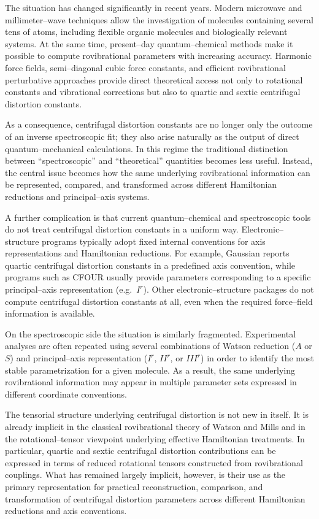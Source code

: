 The situation has changed significantly in recent years. Modern
microwave and millimeter--wave techniques allow the investigation of
molecules containing several tens of atoms, including flexible
organic molecules and biologically relevant systems. At the same time,
present--day quantum--chemical methods make it possible to compute
rovibrational parameters with increasing accuracy. Harmonic force
fields, semi--diagonal cubic force constants, and efficient
rovibrational perturbative approaches provide direct theoretical
access not only to rotational constants and vibrational corrections
but also to quartic and sextic centrifugal distortion
constants.\cite{Mills1972,Nielsen1951}

As a consequence, centrifugal distortion constants are no longer only
the outcome of an inverse spectroscopic fit; they also arise naturally
as the output of direct quantum--mechanical calculations. In this
regime the traditional distinction between ``spectroscopic'' and
``theoretical'' quantities becomes less useful. Instead, the central
issue becomes how the same underlying rovibrational information can be
represented, compared, and transformed across different Hamiltonian
reductions and principal--axis systems.

A further complication is that current quantum--chemical and
spectroscopic tools do not treat centrifugal distortion constants in
a uniform way. Electronic--structure programs typically adopt fixed
internal conventions for axis representations and Hamiltonian
reductions. For example, Gaussian reports quartic centrifugal
distortion constants in a predefined axis convention, while programs
such as CFOUR usually provide parameters corresponding to a specific
principal--axis representation (e.g.\ $I^r$). Other electronic--structure
packages do not compute centrifugal distortion constants at all, even
when the required force--field information is available.

On the spectroscopic side the situation is similarly fragmented.
Experimental analyses are often repeated using several combinations of
Watson reduction ($A$ or $S$) and principal--axis representation
($I^r$, $II^r$, or $III^r$) in order to identify the most stable
parametrization for a given molecule. As a result, the same underlying
rovibrational information may appear in multiple parameter sets
expressed in different coordinate conventions.

The tensorial structure underlying centrifugal distortion is not new
in itself. It is already implicit in the classical rovibrational
theory of Watson and Mills and in the rotational--tensor viewpoint
underlying effective Hamiltonian treatments.
\cite{Mills1972,Watson1968,Watson1977,Kirschner1983}
In particular, quartic and sextic centrifugal distortion contributions
can be expressed in terms of reduced rotational tensors constructed
from rovibrational couplings. What has remained largely implicit,
however, is their use as the primary representation for practical
reconstruction, comparison, and transformation of centrifugal
distortion parameters across different Hamiltonian reductions and axis
conventions.

